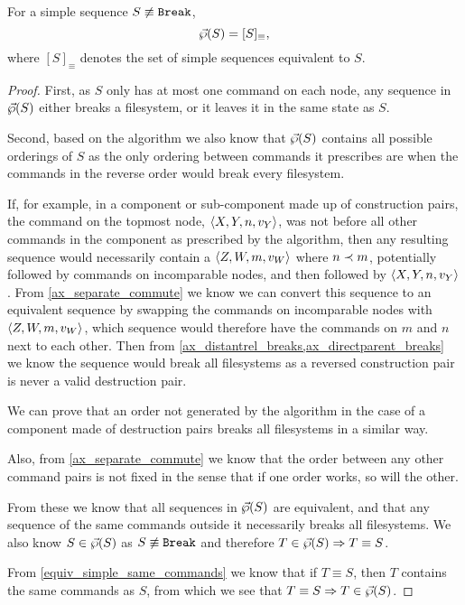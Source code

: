 \begin{mylem}\label{simple_reorder_equiv}
For a simple sequence $S\not\equiv\mathtt{Break}$,
\[ \vec{\wp}({S}) = [S]_\equiv, \]
where $[S]_\equiv$ denotes the set of simple sequences equivalent to $S$.
\end{mylem}
\begin{proof}
First, as $S$ only has at most one command on each node,
any sequence in $\vec{\wp}({S})$ either breaks a filesystem,
or it leaves it in the same state as $S$.

Second, based on the algorithm we also know that $\vec{\wp}({S})$ contains
all possible orderings of $S$ as the only ordering between commands
it prescribes are when the commands in the reverse order would break every filesystem.

If, for example, in a component or sub-component
made up of construction pairs,
the command on the topmost node, $\langle{X,Y,n,v_Y}\rangle$, was not before all other commands
in the component as prescribed by the algorithm,
then any resulting sequence would necessarily contain
a $\langle{Z,W,m,v_W}\rangle$ where $n\prec m$, potentially followed by commands
on incomparable nodes, and then followed by $\langle{X,Y,n,v_Y}\rangle$.
From \cref{ax_separate_commute} we know we can convert this sequence
to an equivalent sequence by swapping the commands on incomparable nodes with
$\langle{Z,W,m,v_W}\rangle$, which sequence would therefore have the commands on
$m$ and $n$ next to each other. Then from \cref{ax_distantrel_breaks,ax_directparent_breaks}
we know the sequence would break all filesystems
as a reversed construction pair is never a valid destruction pair.

We can prove that an order not generated by the algorithm
in the case of a component made of destruction pairs breaks all filesystems
in a similar way.

Also, from \cref{ax_separate_commute} we know
that the order between any other command pairs is not fixed in the sense
that if one order works, so will the other.

From these we know that all sequences in $\vec{\wp}({S})$
are equivalent, and that any sequence of the same commands outside it
necessarily breaks all filesystems.
We also know $S\in\vec{\wp}({S})$ as $S\not\equiv\mathtt{Break}$
and therefore $T\in\vec{\wp}({S}) \Rightarrow T\equiv S$.

From \cref{equiv_simple_same_commands} we know that 
if $T\equiv S$, then $T$ contains the same commands as $S$,
from which we see
that $T\equiv S\Rightarrow T\in\vec{\wp}({S})$.
\end{proof}






